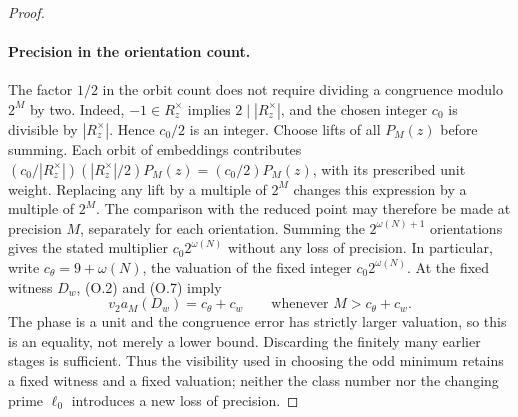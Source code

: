 \begin{proof}
\paragraph{Precision in the orientation count.}
The factor $1/2$ in the orbit count does not require dividing a
congruence modulo $2^M$ by two. Indeed, $-1\in R_z^\times$ implies
$2\mid |R_z^\times|$, and the chosen integer $c_0$ is divisible by
$|R_z^\times|$. Hence $c_0/2$ is an integer. Choose lifts of all
$P_M(z)$ before summing. Each orbit of embeddings contributes
$(c_0/|R_z^\times|)(|R_z^\times|/2)P_M(z)=(c_0/2)P_M(z)$,
with its prescribed unit weight. Replacing any lift by a multiple
of $2^M$ changes this expression by a multiple of $2^M$.
The comparison with the reduced point may therefore be made at
precision $M$, separately for each orientation. Summing the
$2^{\omega(N)+1}$ orientations gives the stated multiplier
$c_0 2^{\omega(N)}$ without any loss of precision.
In particular, write $c_\theta=9+\omega(N)$, the valuation of
the fixed integer $c_0 2^{\omega(N)}$. At the fixed witness $D_w$,
(O.2) and (O.7) imply
\[
 v_2a_M(D_w)=c_\theta+c_w
       \qquad\text{whenever }M>c_\theta+c_w.
\]
The phase is a unit and the congruence error has strictly larger
valuation, so this is an equality, not merely a lower bound.
Discarding the finitely many earlier stages is sufficient. Thus the
visibility used in choosing the odd minimum retains a fixed witness
and a fixed valuation; neither the class number nor the changing
prime $\ell_0$ introduces a new loss of precision.

\end{proof}

